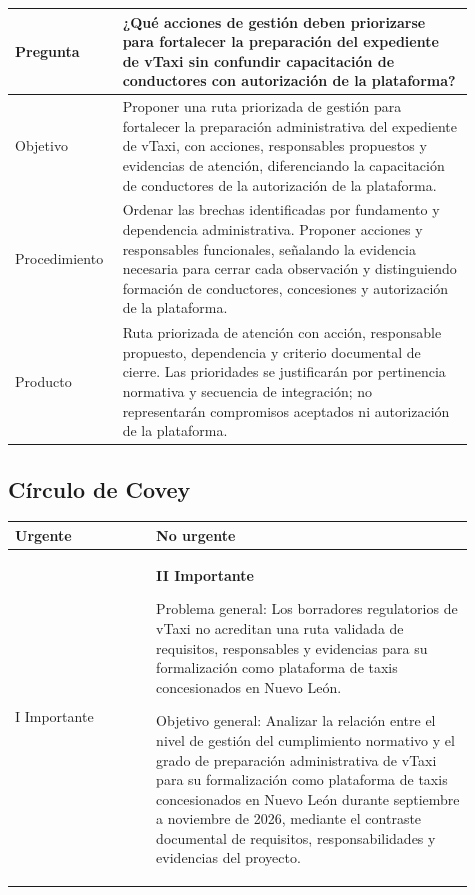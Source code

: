 {\begin{longtable}{p{0.19\linewidth}p{0.72\linewidth}}
Pregunta & ¿Qué acciones de gestión deben priorizarse para fortalecer la preparación del expediente de vTaxi sin confundir capacitación de conductores con autorización de la plataforma? \\ \hline

Objetivo & Proponer una ruta priorizada de gestión para fortalecer la preparación administrativa del expediente de vTaxi, con acciones, responsables propuestos y evidencias de atención, diferenciando la capacitación de conductores de la autorización de la plataforma. \\ \hline

Procedimiento & Ordenar las brechas identificadas por fundamento y dependencia administrativa. Proponer acciones y responsables funcionales, señalando la evidencia necesaria para cerrar cada observación y distinguiendo formación de conductores, concesiones y autorización de la plataforma. \\ \hline

Producto & Ruta priorizada de atención con acción, responsable propuesto, dependencia y criterio documental de cierre. Las prioridades se justificarán por pertinencia normativa y secuencia de integración; no representarán compromisos aceptados ni autorización de la plataforma. \\ \hline

\end{longtable}

\subsection{Círculo de Covey}

\begin{longtable}{p{0.28\linewidth}p{0.63\linewidth}}

\textbf{Urgente} & \textbf{No urgente} \\ \hline

I Importante & \textbf{II Importante}\par Problema general: Los borradores regulatorios de vTaxi no acreditan una ruta validada de requisitos, responsables y evidencias para su formalización como plataforma de taxis concesionados en Nuevo León.\par Objetivo general: Analizar la relación entre el nivel de gestión del cumplimiento normativo y el grado de preparación administrativa de vTaxi para su formalización como plataforma de taxis concesionados en Nuevo León durante septiembre a noviembre de 2026, mediante el contraste documental de requisitos, responsabilidades y evidencias del proyecto. \\ \hline


\end{longtable}}

